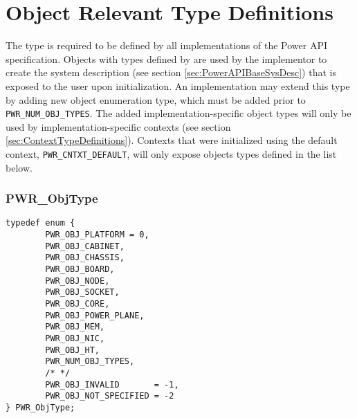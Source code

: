\section{Object Relevant Type Definitions}\label{sec:ObjectTypeDefinitions}

The  type is required to be defined by all implementations of the Power API specification. 
Objects with types defined by  are used by the implementor to create the system description (see section \ref{sec:PowerAPIBaseSysDesc}) that is exposed to the user upon initialization.
An implementation may extend this type by adding new object enumeration type, which must be added prior to \texttt{PWR_NUM_OBJ_TYPES}.
The added implementation-specific object types will only be used by implementation-specific contexts (see section \ref{sec:ContextTypeDefinitions}).
Contexts that were initialized using the default context, \texttt{PWR_CNTXT_DEFAULT}, will only expose objects types defined in the list below.


\subsubsection{PWR_ObjType}\label{type:ObjType}
\begin{center}
\begin{minipage}{.95\linewidth}%
\begin{lstlisting}
typedef enum {
        PWR_OBJ_PLATFORM = 0,
        PWR_OBJ_CABINET,
        PWR_OBJ_CHASSIS,
        PWR_OBJ_BOARD,
        PWR_OBJ_NODE,
        PWR_OBJ_SOCKET,
        PWR_OBJ_CORE,
        PWR_OBJ_POWER_PLANE,
        PWR_OBJ_MEM,
        PWR_OBJ_NIC,
        PWR_OBJ_HT,
        PWR_NUM_OBJ_TYPES,
        /* */
        PWR_OBJ_INVALID       = -1,
        PWR_OBJ_NOT_SPECIFIED = -2
} PWR_ObjType;
\end{lstlisting}
\end{minipage}
\end{center}




